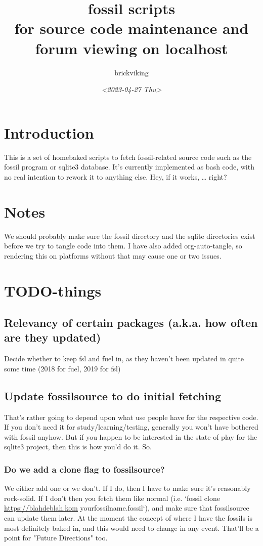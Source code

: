 \documentclass[11pt]{article}
\author{brickviking}
\date{\textit{<2023-04-27 Thu>}}
\title{fossil scripts\\\medskip
\large for source code maintenance and forum viewing on localhost}
\begin{document}
\maketitle
\setcounter{tocdepth}{2}
\tableofcontents



\section*{Introduction}
\label{sec:orga012ea9}
This is a set of homebaked scripts to fetch fossil-related source code such as the fossil program
or sqlite3 database. It's currently implemented as bash code, with no real intention to rework it to anything
else. Hey, if it works, \ldots{} right?

\section*{Notes}
\label{sec:orgf8594f5}
We should probably make sure the fossil directory and the sqlite directories exist before we
try to tangle code into them.
I have also added org-auto-tangle, so rendering this on platforms without that may cause one or two issues.

\section*{TODO-things}
\label{sec:org5d329ce}
\subsection*{Relevancy of certain packages (a.k.a. how often are they updated)}
\label{sec:org67f8c0d}
Decide whether to keep fsl and fuel in, as they haven't been updated in quite some time (2018 for fuel,
2019 for fsl)
\subsection*{Update fossilsource to do initial fetching}
\label{sec:org59a98ba}
That's rather going to depend upon what use people have for the respective code. If you don't need it
for study/learning/testing, generally you won't have bothered with fossil anyhow. But if you happen to
be interested in the state of play for the sqlite3 project, then this is how you'd do it. So.

\subsubsection*{Do we add a clone flag to fossilsource?}
\label{sec:orgd2f5755}
We either add one or we don't. If I do, then I have to make sure it's reasonably rock-solid. If I don't
then you fetch them like normal (i.e. `fossil clone \url{https://blahdeblah.kom} yourfossilname.fossil`), and make
sure that fossilsource can update them later. At the moment the concept of where I have the fossils is most
definitely baked in, and this would need to change in any event. That'll be a point for "Future Directions" too.
\end{document}
